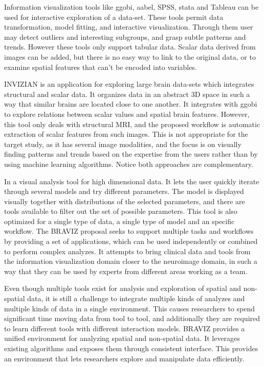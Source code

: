 \documentclass[utf8,paper]{frontiersSCNS} %
\begin{document}
Information visualization tools like ggobi\citep{cook_interactive_2007}, aabel, SPSS, stata and Tableau\citep{hanrahan_tableau_2003} can be used for interactive exploration of a data-set. These tools permit data transformation, model fitting, and interactive visualization. Through them user may detect outliers and interesting subgroups, and grasp subtle patterns and trends. However these tools only support tabular data. Scalar data derived from images can be added, but there is no easy way to link to the original data, or to examine spatial features that can't be encoded into variables. 

INVIZIAN \citep{bowman_query-based_2011,bowman_feature-similarity_2012,bowman_visual_2012} is an application for exploring large brain data-sets which integrates structural and scalar data. It organizes data in an abstract 3D space in such a way that similar brains are located close to one another. It integrates with ggobi to explore relations between scalar values and spatial brain features. However, this tool only deals with structural MRI, and the proposed workflow is automatic extraction of scalar features from such images. This is not appropriate for the target study, as it has several image modalities, and the focus is on visually finding patterns and trends based on the expertise from the users rather than by using machine learning algorithms. Notice both approaches are complementary.

In \citep{hinterberg_peax:_2014} a visual analysis tool for high dimensional data. It lets the user quickly iterate through several models and try different parameters. The model is displayed visually together with distributions of the selected parameters, and there are tools available to filter out the set of possible parameters. This tool is also optimized for a single type of data, a single type of model and an specific workflow. The BRAVIZ proposal seeks to support multiple tasks and workflows by providing a set of applications, which can be used independently or combined to perform complex analyzes. It attempts to bring clinical data and tools from the information visualization domain closer to the neuroimage domain, in such a way that they can be used by experts from different areas working as a team.

Even though multiple tools exist for analysis and exploration of spatial and non-spatial data, it is still a challenge to integrate multiple kinds of analyzes and multiple kinds of data in a single environment. This causes researchers to spend significant time moving data from tool to tool, and additionally they are required to learn different tools with different interaction models. BRAVIZ provides a unified environment for analyzing spatial and non-spatial data. It leverages existing algorithms and exposes them through  consistent interface. This provides an environment that lets researchers explore and manipulate data efficiently.
\end{document}
